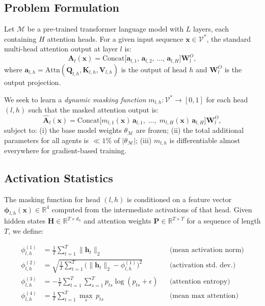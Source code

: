 \documentclass{article}
\newcommand{\phivec}{\boldsymbol{\phi}}
\newcommand{\R}{\mathbb{R}}
\begin{document}
\subsection{Problem Formulation}
\label{sec:method_formulation}

Let $\mathcal{M}$ be a pre-trained transformer language model with $L$ layers, each containing
$H$ attention heads. For a given input sequence $\mathbf{x} \in \mathcal{V}^*$, the standard
multi-head attention output at layer $l$ is:
\[
  \mathbf{A}_l(\mathbf{x}) = \text{Concat}\bigl[\mathbf{a}_{l,1},\, \mathbf{a}_{l,2},\,
  \ldots,\, \mathbf{a}_{l,H}\bigr] \mathbf{W}^O_l,
\]
where $\mathbf{a}_{l,h} = \text{Attn}(\mathbf{Q}_{l,h}, \mathbf{K}_{l,h}, \mathbf{V}_{l,h})$
is the output of head $h$ and $\mathbf{W}^O_l$ is the output projection.

We seek to learn a \emph{dynamic masking function}
$m_{l,h} : \mathcal{V}^* \to [0, 1]$ for each head $(l, h)$ such that the masked attention
output is:
\[
  \hat{\mathbf{A}}_l(\mathbf{x})
  = \text{Concat}\bigl[m_{l,1}(\mathbf{x})\,\mathbf{a}_{l,1},\;\ldots,\;
    m_{l,H}(\mathbf{x})\,\mathbf{a}_{l,H}\bigr]\mathbf{W}^O_l,
\]
subject to: (i) the base model weights $\theta_{\mathcal{M}}$ are frozen; (ii) the total
additional parameters for all agents is $\ll 1\%$ of $|\theta_{\mathcal{M}}|$; (iii)
$m_{l,h}$ is differentiable almost everywhere for gradient-based training.

\subsection{Activation Statistics}
\label{sec:method_stats}

The masking function for head $(l,h)$ is conditioned on a feature vector
$\phivec_{l,h}(\mathbf{x}) \in \R^4$ computed from the intermediate activations of
that head. Given hidden states $\mathbf{H} \in \R^{T \times d_h}$ and attention weights
$\mathbf{P} \in \R^{T \times T}$ for a sequence of length $T$, we define:

\begin{align}
  \phi^{(1)}_{l,h} &= \frac{1}{T}\sum_{t=1}^{T} \|\mathbf{h}_t\|_2
    && \text{(mean activation norm)} \label{eq:phi1} \\
  \phi^{(2)}_{l,h} &= \sqrt{\frac{1}{T}\sum_{t=1}^{T}
    \bigl(\|\mathbf{h}_t\|_2 - \phi^{(1)}_{l,h}\bigr)^2}
    && \text{(activation std.\ dev.)} \label{eq:phi2} \\
  \phi^{(3)}_{l,h} &= -\frac{1}{T}\sum_{t=1}^{T} \sum_{s=1}^{T}
    p_{ts} \log(p_{ts} + \epsilon)
    && \text{(attention entropy)} \label{eq:phi3} \\
  \phi^{(4)}_{l,h} &= \frac{1}{T}\sum_{t=1}^{T} \max_{s}\, p_{ts}
    && \text{(mean max attention)} \label{eq:phi4}
\end{align}
\end{document}
